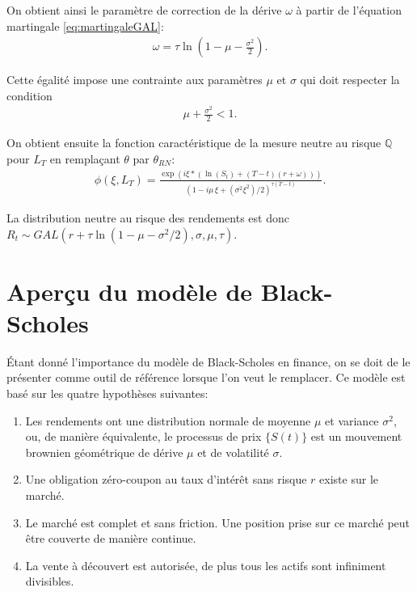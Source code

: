 On obtient ainsi le paramètre de correction de la dérive $\omega$ à
partir de l'équation martingale \eqref{eq:martingaleGAL}:
\begin{align}
  \label{eq:omegaGAL}
  \omega = \tau\ln(1-\mu-\frac{\sigma^2}{2}).
\end{align}

Cette égalité impose une contrainte aux paramètres $\mu$ et $\sigma$
qui doit respecter la condition
\begin{align}
  \label{eq:inegaliteparamrn}
  \mu+\frac{\sigma^2}{2} < 1.
\end{align}

On obtient ensuite la fonction caractéristique de la mesure neutre au
risque $\mathbb{Q}$ pour $L_T$ en remplaçant $\theta$ par
$\theta_{RN}$:
\begin{align}
  \label{eq:fncaractGALrn}
  \phi(\xi,L_T) = \frac{\exp\left(i\xi*\left(\ln\left(S_{t}\right)+\left(T-t\right)\left(r+\omega\right)\right)\right)}{\left(1-i\mu\,\xi+\left(\sigma^2\xi^2\right)/2\right)^{\tau\left(T-t\right)}}.
\end{align}

La distribution neutre au risque des rendements est donc $R_t \sim
GAL(r+\tau\ln(1-\mu-\sigma^2/2),\sigma,\mu,\tau)$.

\section{Aperçu du modèle de Black-Scholes}
\label{sec:blackscholes}

Étant donné l'importance du modèle de Black-Scholes en finance, on se
doit de le présenter comme outil de référence lorsque l'on veut le
remplacer. Ce modèle est basé sur les quatre hypothèses suivantes:
\begin{enumerate}
\item Les rendements ont une distribution normale de moyenne $\mu$ et
  variance $\sigma^2$, ou, de manière équivalente, le processus de
  prix $\lbrace S(t) \rbrace$ est un mouvement brownien géométrique de
  dérive $\mu$ et de volatilité $\sigma$.
\item Une obligation zéro-coupon au taux d'intérêt sans risque $r$
  existe sur le marché.
\item Le marché est complet et sans friction. Une position prise sur
  ce marché peut être couverte de manière continue.
\item La vente à découvert est autorisée, de plus tous les actifs sont
  infiniment divisibles.
\end{enumerate}

